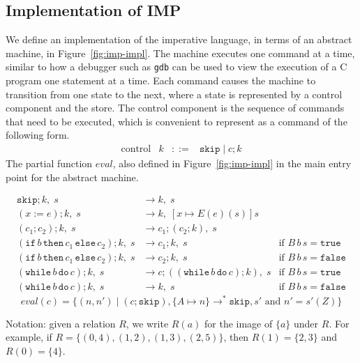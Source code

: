 \documentclass{tufte-handout}
\newcommand{\ASSIGN}[2]{#1 \mathrel{:=} #2}
\newcommand{\SEQ}[2]{#1 \mathrel{;} #2}
\newcommand{\SKIP}[0]{\mathtt{skip}}
\newcommand{\IF}[3]{\mathtt{if}\,#1\,\mathtt{then}\,#2\,\mathtt{else}\,#3}
\newcommand{\WHILE}[2]{\mathtt{while}\,#1\,\mathtt{do}\,#2}
\newcommand{\TRUE}[0]{\mathtt{true}}
\newcommand{\FALSE}[0]{\mathtt{false}}
\begin{document}
\subsection{Implementation of IMP}

We define an implementation of the imperative language, in terms of an
abstract machine, in Figure~\ref{fig:imp-impl}. The machine executes
one command at a time, similar to how a debugger such as \texttt{gdb}
can be used to view the execution of a C program one statement at a
time. Each command causes the machine to transition from one state to
the next, where a state is represented by a control component and the
store. The control component is the sequence of commands that need to
be executed, which is convenient to represent as a command of the
following form.
\[
\begin{array}{lrcl}
  \text{control} & k & ::= & \SKIP \mid \SEQ{c}{k}
\end{array}
\]
The partial function $\mathit{eval}$, also defined in
Figure~\ref{fig:imp-impl} in the main entry point for the abstract
machine.


\begin{figure*}

\hfill {}
\begin{align*}
  \SEQ{\SKIP}{k},\; s & \longrightarrow k,\; s \\
  \SEQ{(\ASSIGN{x}{e})}{k},\; s & \longrightarrow k,\; [x\mapsto E(e)(s)]s\\
  \SEQ{(\SEQ{c_1}{c_2})}{k},\; s & \longrightarrow
      \SEQ{c_1}{(\SEQ{c_2}{k})},\; s \\
  \SEQ{(\IF{b}{c_1}{c_2})}{k},\; s & \longrightarrow \SEQ{c_1}{k},\; s
     & \text{if } B\,b\,s = \TRUE \\
  \SEQ{(\IF{b}{c_1}{c_2})}{k},\; s & \longrightarrow \SEQ{c_2}{k},\; s
     & \text{if } B\,b\,s = \FALSE \\
  \SEQ{(\WHILE{b}{c})}{k},\; s & \longrightarrow
      \SEQ{c}{(\SEQ{(\WHILE{b}{c})}{k})},\; s
    & \text{if } B\,b\,s = \TRUE \\
  \SEQ{(\WHILE{b}{c})}{k},\; s & \longrightarrow k,\; s
    & \text{if } B\,b\,s = \FALSE 
\end{align*}
\[
  \mathit{eval}(c) = \{ (n,n') \mid
     (\SEQ{c}{\SKIP}), \{A\mapsto n\}
     \longrightarrow^{*} \SKIP, s'
     \text{ and } n' = s'(Z) \}
\]
\caption{Abstract Machine for IMP}
\label{fig:imp-impl}
\end{figure*}

Notation: given a relation $R$, we write $R(a)$ for the image of
$\{a\}$ under $R$. For example, if $R=\{ (0,4), (1,2), (1,3), (2,5)
\}$, then $R(1) = \{2,3\}$ and $R(0) = \{4\}$.
\end{document}

